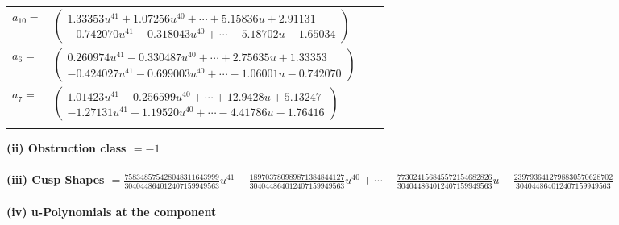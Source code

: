 \documentclass[1p]{elsarticle_modified}
\theoremstyle{definition}
\begin{document}
\begin{tabular}{m{7pt} m{180pt} m{7pt} m{180pt} }
\flushright $a_{10}=$&$\begin{pmatrix}1.33353 u^{41}+1.07256 u^{40}+\cdots+5.15836 u+2.91131\\-0.742070 u^{41}-0.318043 u^{40}+\cdots-5.18702 u-1.65034\end{pmatrix}$ \\
\flushright $a_{6}=$&$\begin{pmatrix}0.260974 u^{41}-0.330487 u^{40}+\cdots+2.75635 u+1.33353\\-0.424027 u^{41}-0.699003 u^{40}+\cdots-1.06001 u-0.742070\end{pmatrix}$ \\
\flushright $a_{7}=$&$\begin{pmatrix}1.01423 u^{41}-0.256599 u^{40}+\cdots+12.9428 u+5.13247\\-1.27131 u^{41}-1.19520 u^{40}+\cdots-4.41786 u-1.76416\end{pmatrix}$\\&\end{tabular}
\flushleft \textbf{(ii) Obstruction class $= -1$}\\~\\
\flushleft \textbf{(iii) Cusp Shapes $= \frac{758348575428048311643999}{304044864012407159949563} u^{41}-\frac{189703780989871384844127}{304044864012407159949563} u^{40}+\cdots-\frac{773024156845572154682826}{304044864012407159949563} u-\frac{2397936412798830570628702}{304044864012407159949563}$}\\~\\
\newpage\renewcommand{\arraystretch}{1}
\flushleft \textbf{(iv) u-Polynomials at the component}\newline \\
\end{document}
